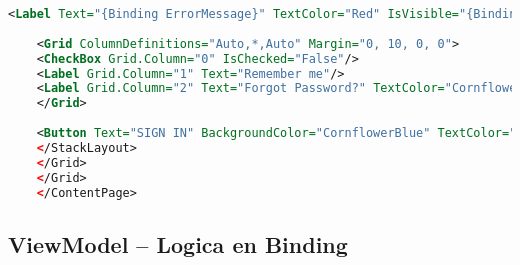 \begin{lstlisting}[language=XML, caption=Gebruikersinterface van de loginpagina, label=lst:login-xaml]
    <Label Text="{Binding ErrorMessage}" TextColor="Red" IsVisible="{Binding IsErrorVisible}" />
    
    <Grid ColumnDefinitions="Auto,*,Auto" Margin="0, 10, 0, 0">
    <CheckBox Grid.Column="0" IsChecked="False"/>
    <Label Grid.Column="1" Text="Remember me"/>
    <Label Grid.Column="2" Text="Forgot Password?" TextColor="CornflowerBlue" FontAttributes="Bold" HorizontalOptions="End"/>
    </Grid>
    
    <Button Text="SIGN IN" BackgroundColor="CornflowerBlue" TextColor="White" FontAttributes="Bold" CornerRadius="30" WidthRequest="200" Margin="0, 15, 0, 0" Command="{Binding LoginCommand}"/>
    </StackLayout>
    </Grid>
    </Grid>
    </ContentPage>
\end{lstlisting}

\subsection{ViewModel – Logica en Binding}

